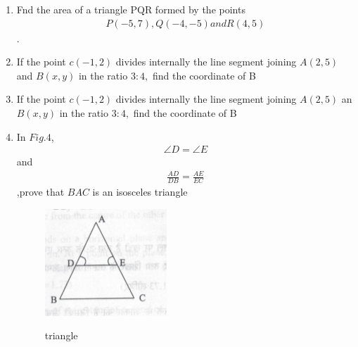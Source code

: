 \documentclass[12pt,-letter paper]{article}
\begin{document}
\begin{enumerate}
	\item Fnd the area of a triangle PQR formed by the points \begin{align}P(-5,7),Q(-4,-5) and R(4,5)\end{align}.
		\item If the point $c(-1,2)$ divides internally the line segment joining $A(2,5)$ and $B(x,y)$ in the ratio $3:4,$ find the coordinate of B  
		\item If the point $c(-1,2)$ divides internally the line segment joining $A(2,5)$ an $B(x,y)$ in the ratio $3:4,$ find the coordinate of B  
		\item In $Fig.4$, \begin{align}\angle D=\angle E\end{align} and \begin{align}\frac{AD}{DB}=\frac{AE}{EC}\end{align},prove that $BAC$ is an isosceles triangle
\begin{figure}[H]    
\includegraphics[width=\columnwidth]{./imagecharan4.jpg}    
\label{fig:fig1}  
\caption{triangle}  
\end{figure}


\end{enumerate}
\end{document}
